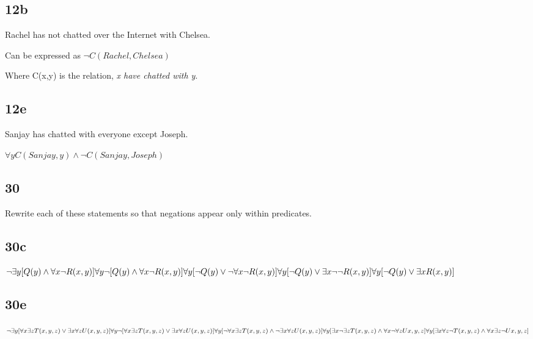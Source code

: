 \documentclass[12pt]{article}
\begin{document}
\subsection{12b}
Rachel has not chatted over the Internet with Chelsea.

Can be expressed as
\begin{math}
  \neg C(Rachel,Chelsea)
\end{math}

Where C(x,y) is the relation, \emph{x have chatted with y}.

\subsection{12e}
Sanjay has chatted with everyone except Joseph.

\begin{math}
  \forall{y} C(Sanjay, y) \wedge \neg C(Sanjay,Joseph)
\end{math}

\subsection{30}
Rewrite each of these statements so that negations appear only within predicates.

\subsection{30c}
\begin{math}
  \neg \exists{y} [Q(y) \wedge \forall{x}\neg R(x,y)] \newline
  \forall{y}\neg [Q(y) \wedge \forall{x}\neg R(x,y)] \newline
  \forall{y}[\neg Q(y) \vee \neg \forall{x} \neg R(x,y)]\newline
  \forall{y}[\neg Q(y)\vee \exists{x} \neg \neg R(x,y)] \newline
  \forall{y}[\neg Q(y)\vee \exists{x}  R(x,y)]
\end{math}

\subsection{30e}
\begin{math}
  \neg \exists{y}[\forall{x}\exists{z}T(x,y,z)\vee \exists{x}\forall{z}U(x,y,z)] \newline
  \forall{y}\neg [\forall{x}\exists{z}T(x,y,z)\vee \exists{x}\forall{z}U(x,y,z)] \newline
  \forall{y}[\neg \forall{x} \exists{z}T(x,y,z)\wedge \neg \exists{x}\forall{z}U(x,y,z)] \newline
  \forall{y}[\exists{x}\neg \exists{z} T(x,y,z) \wedge \forall{x}\neg\forall{z} U{x,y,z}] \newline
  \forall{y}[\exists{x}\forall{z} \neg T(x,y,z) \wedge \forall{x}\exists{z}\neg U{x,y,z}]
\end{math}
\end{document}
